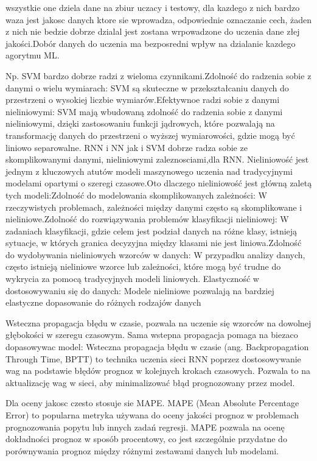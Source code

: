 wszystkie one dziela dane na zbiur uczacy i testowy, dla kazdego z nich bardzo waza jest jakosc danych ktore sie wprowadza, odpowiednie oznaczanie cech, żaden z nich nie bedzie dobrze dzialal jest zostana wrpowadzone do uczenia dane złej jakości.Dobór danych do uczenia ma bezposredni wpływ na dzialanie kazdego agorytmu ML.

Np. SVM bardzo dobrze radzi z wieloma czynnikami.Zdolność do radzenia sobie z danymi o wielu wymiarach: SVM są skuteczne w przekształcaniu danych do przestrzeni o wysokiej liczbie wymiarów.Efektywnoe radzi sobie z danymi nieliniowymi: SVM mają wbudowaną zdolność do radzenia sobie z danymi nieliniowymi, dzięki zastosowaniu funkcji jądrowych, które pozwalają na transformację danych do przestrzeni o wyższej wymiarowości, gdzie mogą być liniowo separowalne.
RNN i NN jak i SVM dobrze radza sobie ze skomplikowanymi danymi, nieliniowymi zaleznosciami,dla RNN. Nieliniowość jest jednym z kluczowych atutów modeli maszynowego uczenia nad tradycyjnymi modelami opartymi o szeregi czasowe.Oto dlaczego nieliniowość jest główną zaletą tych modeli:Zdolność do modelowania skomplikowanych zależności: W rzeczywistych problemach, zależności między danymi często są skomplikowane i nieliniowe.Zdolność do rozwiązywania problemów klasyfikacji nieliniowej: W zadaniach klasyfikacji, gdzie celem jest podział danych na różne klasy, istnieją sytuacje, w których granica decyzyjna między klasami nie jest liniowa.Zdolność do wydobywania nieliniowych wzorców w danych: W przypadku analizy danych, często istnieją nieliniowe wzorce lub zależności, które mogą być trudne do wykrycia za pomocą tradycyjnych modeli liniowych. Elastyczność w dostosowywaniu się do danych: Modele nieliniowe pozwalają na bardziej elastyczne dopasowanie do różnych rodzajów danych

Wsteczna propagacja błędu w czasie, pozwala na uczenie się wzorców na dowolnej głębokości
w szeregu czasowym. Sama wstepna propagacja pomaga na biezaco dopasowywac model: Wsteczna propagacja błędu w czasie (ang. Backpropagation Through Time, BPTT) to technika uczenia sieci RNN poprzez dostosowywanie wag na podstawie błędów prognoz w kolejnych krokach czasowych. Pozwala to na aktualizację wag w sieci, aby minimalizować błąd prognozowany przez model.


Dla oceny jakosc  czesto stosuje sie MAPE.
MAPE (Mean Absolute Percentage Error) to popularna metryka używana do oceny jakości prognoz w problemach prognozowania popytu lub innych zadań regresji. MAPE pozwala na ocenę dokładności prognoz w sposób procentowy, co jest szczególnie przydatne do porównywania prognoz między różnymi zestawami danych lub modelami.


